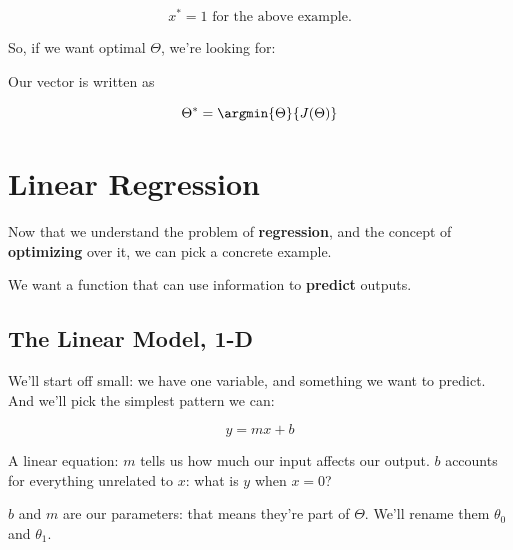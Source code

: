         \miniex 
        
        \begin{equation}
            x^* = 1 \text{ for the above example.}
        \end{equation}
        
        So, if we want optimal $\Theta$, we're looking for:\\
        
        \begin{kequation}
        
            Our  vector is written as 
            
            \begin{equation*}
                \Theta^* = \argmin{ \Theta  }{  J(\Theta)  }
            \end{equation*}
        \end{kequation}
        


\pagebreak

\section{Linear Regression}

    Now that we understand the problem of \textbf{regression}, and the concept of \textbf{optimizing} over it, we can pick a concrete example.
    
    We want a function that can use information to \textbf{predict} outputs.
    
    \subsection{The Linear Model, 1-D}
    
        We'll start off small: we have one variable, and something we want to predict. And we'll pick the simplest pattern we can:

        \begin{equation}
            y = mx+b
        \end{equation}
        
        A linear equation: $m$ tells us how much our input affects our output. $b$ accounts for everything unrelated to $x$: what is $y$ when $x=0$?
        
        $b$ and $m$ are our parameters: that means they're part of $\Theta$. We'll rename them $\theta_0$ and $\theta_1$. 
        
